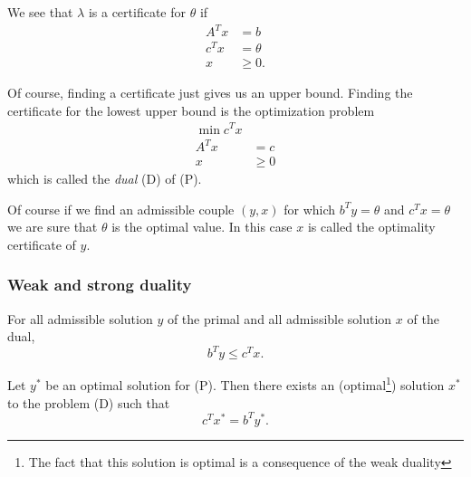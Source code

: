 We see that $\lambda$ is a certificate for $\theta$ if
\begin{align*}
  A^T x & = b\\
  c^T x & = \theta\\
  x & \geq 0.
\end{align*}

Of course, finding a certificate just gives us an upper bound.
Finding the certificate for the lowest upper bound is the optimization problem
\begin{align*}
  \min c^T x\\
  A^T x & = c\\
  x & \geq 0
\end{align*}
which is called the \emph{dual} (D) of (P).

Of course if we find an admissible couple $(y,x)$ for which $b^T y = \theta$ and
$c^T x = \theta$ we are sure that $\theta$ is the optimal value.
In this case $x$ is called the optimality certificate of $y$.

\subsubsection{Weak and strong duality}
\begin{mytheo}
  For all admissible solution $y$ of the primal and all admissible solution $x$ of the dual,
  \[ b^Ty \leq c^Tx. \]
\end{mytheo}

\begin{mytheo}
  Let $y^*$ be an optimal solution for (P).
  Then there exists an (optimal\footnote{The fact that this solution is optimal is a consequence of the weak duality}) solution $x^*$ to the problem (D) such that
  \[ c^Tx^* = b^Ty^*. \]
\end{mytheo}

